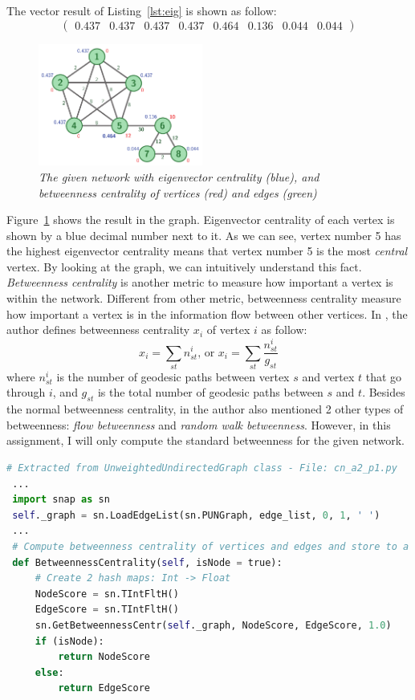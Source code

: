 \documentclass[a4paper,12pt]{article}
\begin{document}
\noindent
The vector result of Listing~\ref{lst:eig} is shown as follow:
\[ \left( \begin{array}{cccccccc} 0.437 & 0.437 & 0.437 & 0.437 & 0.464 & 0.136 & 0.044 & 0.044 \end{array} \right) \]
\begin{figure}
    \vspace{-1em}
    \centering
      \includegraphics[width=0.48\textwidth]{cn_a2_eigbet}
    \caption{\emph{The given network with eigenvector centrality (blue), and betweenness centrality of vertices (red) and edges (green)}}
    \label{fig:eigbet}
    \vspace{-1em}
\end{figure}
\noindent
Figure~\ref{fig:eigbet} shows the result in the graph. Eigenvector centrality of each vertex is shown by a blue decimal number next to it. As we can see, vertex number 5 has the highest eigenvector centrality means that vertex number 5 is the most \emph{central} vertex. By looking at the graph, we can intuitively understand this fact.
\newline
\noindent
\emph{Betweenness centrality} is another metric to measure how important a vertex is within the network. Different from other metric, betweenness centrality measure how important a vertex is in the information flow between other vertices. In \cite{net}, the author defines betweenness centrality $x_i$ of vertex $i$ as follow:
$$ x_i = \displaystyle \sum_{st} n_{st}^i \mbox{, or } x_i = \displaystyle \sum_{st} \frac{n_{st}^i}{g_{st}} $$
where $n^i_{st}$ is the number of geodesic paths between vertex $s$ and vertex $t$ that go through $i$, and $g_{st}$ is the total number of geodesic paths between $s$ and $t$. Besides the normal betweenness centrality, in \cite{net} the author also mentioned 2 other types of betweenness: \emph{flow betweenness} and \emph{random walk betweenness}. However, in this assignment, I will only compute the standard betweenness for the given network.

\begin{lstlisting}[language=Python, caption={Betweenness centrality computation with SNAP.PY}, label={lst:bet}]
 # Extracted from UnweightedUndirectedGraph class - File: cn_a2_p1.py
 ...
 import snap as sn
 self._graph = sn.LoadEdgeList(sn.PUNGraph, edge_list, 0, 1, ' ')
 ...
 # Compute betweenness centrality of vertices and edges and store to a hash table.
 def BetweennessCentrality(self, isNode = true):
     # Create 2 hash maps: Int -> Float
     NodeScore = sn.TIntFltH()
     EdgeScore = sn.TIntFltH()
     sn.GetBetweennessCentr(self._graph, NodeScore, EdgeScore, 1.0)
     if (isNode):
         return NodeScore
     else:
         return EdgeScore
\end{lstlisting}
\end{document}
